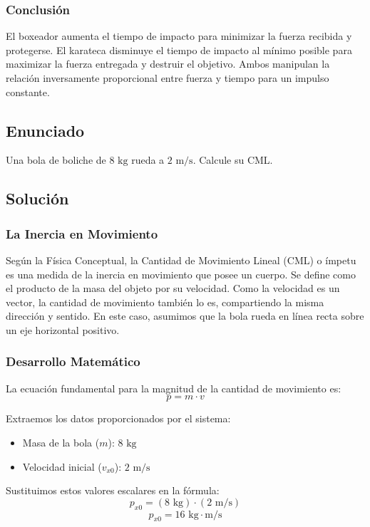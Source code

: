 \documentclass{article}
\begin{document}
\subsubsection*{Conclusión}
El boxeador aumenta el tiempo de impacto para minimizar la fuerza recibida y protegerse. El karateca disminuye el tiempo de impacto al mínimo posible para maximizar la fuerza entregada y destruir el objetivo. Ambos manipulan la relación inversamente proporcional entre fuerza y tiempo para un impulso constante.

\newpage

\subsection*{Enunciado}
Una bola de boliche de $8 \text{ kg}$ rueda a $2 \text{ m/s}$. Calcule su CML.

\subsection*{Solución}

\subsubsection*{La Inercia en Movimiento}
Según la Física Conceptual, la Cantidad de Movimiento Lineal (CML) o ímpetu es una medida de la inercia en movimiento que posee un cuerpo. Se define como el producto de la masa del objeto por su velocidad. Como la velocidad es un vector, la cantidad de movimiento también lo es, compartiendo la misma dirección y sentido. En este caso, asumimos que la bola rueda en línea recta sobre un eje horizontal positivo.

\subsubsection*{Desarrollo Matemático}
La ecuación fundamental para la magnitud de la cantidad de movimiento es:
$$p = m \cdot v$$

Extraemos los datos proporcionados por el sistema:
\begin{itemize}
    \item Masa de la bola ($m$): $8 \text{ kg}$
    \item Velocidad inicial ($v_{x0}$): $2 \text{ m/s}$
\end{itemize}

Sustituimos estos valores escalares en la fórmula:
$$p_{x0} = (8 \text{ kg}) \cdot (2 \text{ m/s})$$
$$p_{x0} = 16 \text{ kg}\cdot\text{m/s}$$
\end{document}
